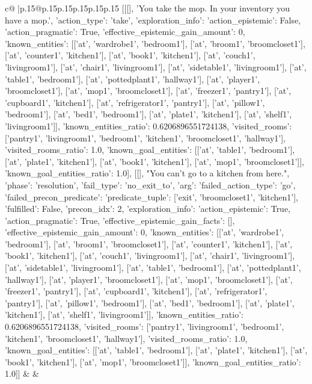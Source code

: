 \documentclass{article}
\begin{document}
{\begin{supertabular}{c@{$\;$}|p{.15\linewidth}@{}p{.15\linewidth}p{.15\linewidth}p{.15\linewidth}p{.15\linewidth}p{.15\linewidth}}
{{{	 [[[], 'You take the mop. In your inventory you have a mop.', {'action_type': 'take', 'exploration_info': {'action_epistemic': False, 'action_pragmatic': True, 'effective_epistemic_gain_amount': 0, 'known_entities': [['at', 'wardrobe1', 'bedroom1'], ['at', 'broom1', 'broomcloset1'], ['at', 'counter1', 'kitchen1'], ['at', 'book1', 'kitchen1'], ['at', 'couch1', 'livingroom1'], ['at', 'chair1', 'livingroom1'], ['at', 'sidetable1', 'livingroom1'], ['at', 'table1', 'bedroom1'], ['at', 'pottedplant1', 'hallway1'], ['at', 'player1', 'broomcloset1'], ['at', 'mop1', 'broomcloset1'], ['at', 'freezer1', 'pantry1'], ['at', 'cupboard1', 'kitchen1'], ['at', 'refrigerator1', 'pantry1'], ['at', 'pillow1', 'bedroom1'], ['at', 'bed1', 'bedroom1'], ['at', 'plate1', 'kitchen1'], ['at', 'shelf1', 'livingroom1']], 'known_entities_ratio': 0.6206896551724138, 'visited_rooms': ['pantry1', 'livingroom1', 'bedroom1', 'kitchen1', 'broomcloset1', 'hallway1'], 'visited_rooms_ratio': 1.0, 'known_goal_entities': [['at', 'table1', 'bedroom1'], ['at', 'plate1', 'kitchen1'], ['at', 'book1', 'kitchen1'], ['at', 'mop1', 'broomcloset1']], 'known_goal_entities_ratio': 1.0}}], [[], "You can't go to a kitchen from here.", {'phase': 'resolution', 'fail_type': 'no_exit_to', 'arg': {'failed_action_type': 'go', 'failed_precon_predicate': {'predicate_tuple': ['exit', 'broomcloset1', 'kitchen1'], 'fulfilled': False, 'precon_idx': 2}}, 'exploration_info': {'action_epistemic': True, 'action_pragmatic': True, 'effective_epistemic_gain_facts': [], 'effective_epistemic_gain_amount': 0, 'known_entities': [['at', 'wardrobe1', 'bedroom1'], ['at', 'broom1', 'broomcloset1'], ['at', 'counter1', 'kitchen1'], ['at', 'book1', 'kitchen1'], ['at', 'couch1', 'livingroom1'], ['at', 'chair1', 'livingroom1'], ['at', 'sidetable1', 'livingroom1'], ['at', 'table1', 'bedroom1'], ['at', 'pottedplant1', 'hallway1'], ['at', 'player1', 'broomcloset1'], ['at', 'mop1', 'broomcloset1'], ['at', 'freezer1', 'pantry1'], ['at', 'cupboard1', 'kitchen1'], ['at', 'refrigerator1', 'pantry1'], ['at', 'pillow1', 'bedroom1'], ['at', 'bed1', 'bedroom1'], ['at', 'plate1', 'kitchen1'], ['at', 'shelf1', 'livingroom1']], 'known_entities_ratio': 0.6206896551724138, 'visited_rooms': ['pantry1', 'livingroom1', 'bedroom1', 'kitchen1', 'broomcloset1', 'hallway1'], 'visited_rooms_ratio': 1.0, 'known_goal_entities': [['at', 'table1', 'bedroom1'], ['at', 'plate1', 'kitchen1'], ['at', 'book1', 'kitchen1'], ['at', 'mop1', 'broomcloset1']], 'known_goal_entities_ratio': 1.0}}]] 
	  } 
	   } 
	   } 
	 & & \\ 
 


\end{supertabular}}
\end{document}
